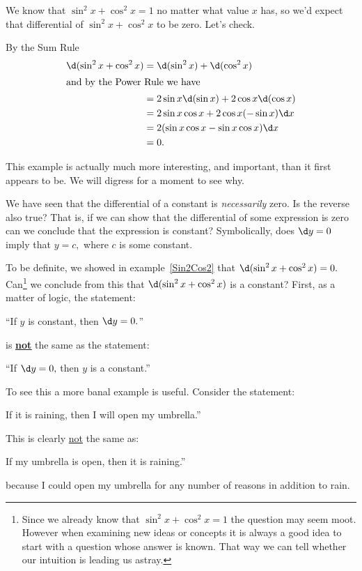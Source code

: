 \begin{myexample}{}
  \label{Sin2Cos2}
  We know that \(\sin^2x+\cos^2x=1\) no matter what value $x$ has, so
  we'd expect that differential of \(\sin^2x+\cos^2x\) to be
  zero. Let's check.

  By the Sum Rule
  \begin{align*}
    \d(\sin^2x+\cos^2x) &= \d(\sin^2x) + \d(\cos^2x)\\
\intertext{and by the Power Rule we have}
    &= 2\sin x\d(\sin x) + 2\cos x\d(\cos x)\\
    &= 2\sin x\cos x + 2\cos x(-\sin x)\d x\\
    &= 2(\sin x\cos x - \sin x\cos x)\d x\\
    &= 0.
  \end{align*}
\end{myexample}

This example is actually much more interesting, and important, than it
first appears to be. We will digress for a moment to see why.

We have seen that the differential
  of a constant is \emph{necessarily} zero. Is the reverse also true?
That is, if we can show that the differential of some expression
is zero can we conclude that the expression is constant? Symbolically,
does $\d y = 0$ imply that $y=c,$ where $c$ is some constant. 

To be definite, we showed in example~\ref{Sin2Cos2} that
\(\d(\sin^2x+\cos^2x)=0.\) Can\footnote{
Since we already know that \(\sin^2x+\cos^2x=1\)
the question may seem moot. However when examining new ideas or
concepts it is always a good idea to start with a question whose
answer is known. That way we can tell whether our intuition is leading
us astray.} we conclude from this that
\(\d(\sin^2x+\cos^2x)\) is a constant?
First, as a matter of logic, the statement:\\
\centerline{``If $y$ is constant, then $\d y=0.$''}
is \underline{\underline{\underline{\bf \Large not}}} the same as the
statement:\\
\centerline{``If $\d y=0,$ then $y$ is a constant.''}
To see this a more banal example is useful. Consider the statement:\\
\centerline{If it is raining, then I will open my umbrella.''}
This is clearly \underline{not} the same as:\\
\centerline{If my umbrella is open, then it is raining.''}
because I could open my umbrella for any number of reasons in addition
to rain.

